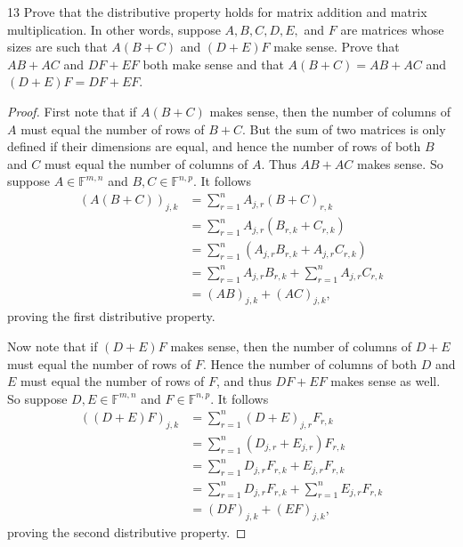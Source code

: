 \documentclass[11pt]{extarticle}
\newenvironment{problem}[1]{\begin{prob*}{#1}{}}{\end{prob*}}
\newcommand{\F}{\mathbb{F}}
\begin{document}
\begin{problem}{13}
Prove that the distributive property holds for matrix addition and matrix multiplication.  In other words, suppose $A,B,C,D,E,$ and $F$ are matrices whose sizes are such that $A(B+C)$ and $(D+E)F$ make sense.  Prove that $AB+AC$ and $DF + EF$ both make sense and that $A(B+ C) = AB + AC$ and $(D + E)F = DF + EF$.  
\end{problem}
\begin{proof}
First note that if $A(B+C)$ makes sense, then the number of columns of $A$ must equal the number of rows of $B+C$.  But the sum of two matrices is only defined if their dimensions are equal, and hence the number of rows of both $B$ and $C$ must equal the number of columns of $A$.  Thus $AB + AC$ makes sense.  So suppose $A\in\F^{m,n}$ and $B,C\in\F^{n,p}$.  It follows
\begin{align*}
\left(A(B+C)\right)_{j,k} &= \sum_{r = 1}^n A_{j, r}(B + C)_{r,k}\\
&= \sum_{r = 1}^n A_{j, r}(B_{r,k} + C_{r,k})\\
&= \sum_{r = 1}^n\left(A_{j,r}B_{r,k} + A_{j,r}C_{r,k}\right)\\
&=  \sum_{r = 1}^nA_{j,r}B_{r,k} +  \sum_{r = 1}^nA_{j,r}C_{r,k} \\
&= (AB)_{j,k} + (AC)_{j,k},
\end{align*}
proving the first distributive property.
\par Now note that if $(D + E)F$ makes sense, then the number of columns of $D + E$ must equal the number of rows of $F$.  Hence the number of columns of both $D$ and $E$ must equal the number of rows of $F$, and thus $DF+ EF$ makes sense as well.  So suppose $D,E \in\F^{m,n}$ and $F\in\F^{n,p}$.  It follows
\begin{align*}
\left((D+E)F\right)_{j,k} &= \sum_{r = 1}^n (D+E)_{j,r} F_{r, k}\\
&= \sum_{r = 1}^n (D_{j,r} + E_{j,r})F_{r,k}\\
&= \sum_{r = 1}^n D_{j,r}F_{r,k} + E_{j,r}F_{r,k}\\
&= \sum_{r=1}^n D_{j,r}F_{r,k} + \sum_{r = 1}^nE_{j,r}F_{r,k}\\
&= (DF)_{j,k} + (EF)_{j,k},
\end{align*}
proving the second distributive property.
\end{proof}
\end{document}
